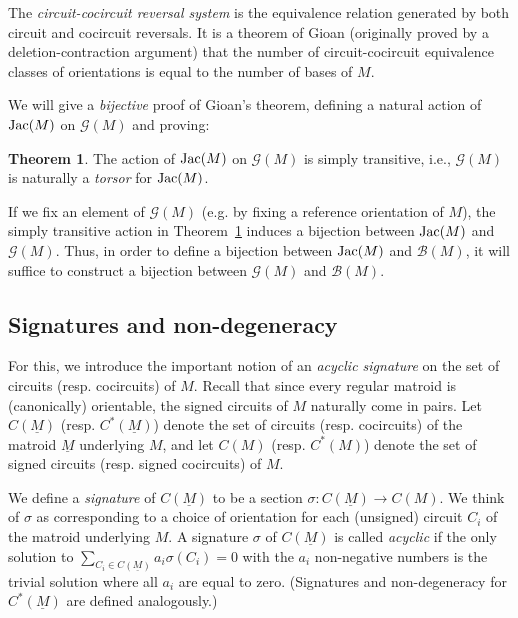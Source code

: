 \documentclass[12pt]{amsart}
\numberwithin{equation}{section}
\theoremstyle{definition}
\newtheorem{theorem}{Theorem}[subsection]
\begin{document}
\medskip

The {\em circuit-cocircuit reversal system} is the equivalence relation generated by both circuit and cocircuit reversals.  It is a theorem of Gioan (originally proved by a deletion-contraction argument) that the number of circuit-cocircuit equivalence classes of orientations is equal to the number of bases of $M$.

\medskip

We will give a {\em bijective} proof of Gioan's theorem, defining a natural action of ${\rm Jac}(M)$ on ${\mathcal G}(M)$ and proving:

\begin{theorem} \label{thm:torsor}
The action of ${\rm Jac}(M)$ on ${\mathcal G}(M)$ is simply transitive, i.e., ${\mathcal G}(M)$ is naturally a {\em torsor} for ${\rm Jac}(M)$.
\end{theorem}

If we fix an element of ${\mathcal G}(M)$ (e.g. by fixing a reference orientation of $M$), the simply transitive action in Theorem~\ref{thm:torsor} induces a bijection between ${\rm Jac}(M)$ and ${\mathcal G}(M)$.  Thus, in order to define a bijection between ${\rm Jac}(M)$ and ${\mathcal B}(M)$, it will suffice to construct a bijection between ${\mathcal G}(M)$ and ${\mathcal B}(M)$.  

\medskip

\subsection{Signatures and non-degeneracy}
\label{sec:signatures}

For this, we introduce the important notion of an {\em acyclic signature} on the set of circuits (resp. cocircuits) of $M$.  Recall that since every regular matroid is (canonically) orientable, the signed circuits of $M$ naturally come in pairs.  Let $C(\underline{M})$ (resp. $C^*(\underline{M})$) denote the set of circuits (resp. cocircuits) of the matroid $\underline{M}$ underlying $M$, and let $C(M)$ (resp. $C^*(M)$) denote the set of signed circuits (resp. signed cocircuits) of $M$.

\medskip

We define a {\em signature} of $C(\underline{M})$ to be a section 
$\sigma : C(\underline{M}) \to C(M)$.
We think of $\sigma$ as corresponding to a choice of orientation for each (unsigned) circuit $C_i$ of the matroid underlying $M$.
A signature $\sigma$ of $C(\underline{M})$ is called {\em acyclic} if the only solution to $\sum_{C_i \in C(\underline{M})} a_i \sigma(C_i) = 0$ with the $a_i$ non-negative numbers is the trivial solution where all $a_i$ are equal to zero.
(Signatures and non-degeneracy for $C^*(\underline{M})$  are defined analogously.) 
\end{document}
